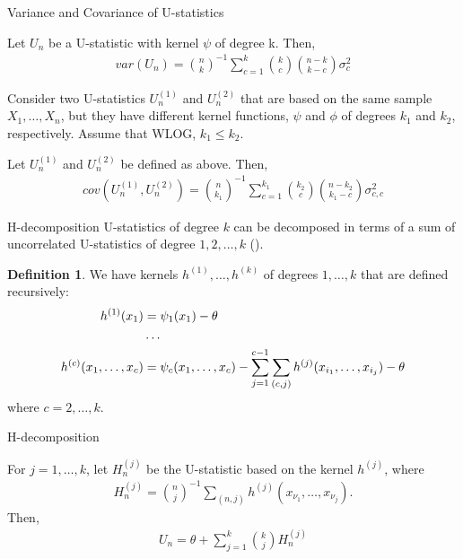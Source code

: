 \documentclass{beamer}
\theoremstyle{definition}
\newtheorem{Def}{Definition}
\numberwithin{Def}{section}
\begin{document}
\begin{frame}{Variance and Covariance of U-statistics}
\begin{theorem}\label{var_u_stat}
Let $U_n$ be a U-statistic with kernel $\psi$ of degree k. Then, 
\begin{align}
    var(U_n) = {n \choose k}^{-1}\sum_{c=1}^k{k \choose c}{n-k \choose k-c} \sigma_c^2
\end{align}
\end{theorem} 
\pause 
Consider two U-statistics $U_n^{(1)}$ and $U_n^{(2)}$ that are based on the same sample $X_1, \dotsc, X_n$, but they have different kernel functions, $\psi$ and $\phi$ of degrees $k_1$ and $k_2$, respectively. Assume that WLOG, $k_1 \leq k_2$. 
    \begin{theorem}
    Let $U_n^{(1)}$ and $U_n^{(2)}$ be defined as above. Then, 
    \begin{align}
        cov(U_n^{(1)}, U_n^{(2)}) = {n \choose k_1}^{-1}\sum_{c=1}^{k_1}{k_2 \choose c}{n-k_2 \choose k_1 - c}\sigma_{c,c}^2
        \end{align}
    \end{theorem}  

\end{frame}

\begin{frame}{H-decomposition}
U-statistics of degree $k$ can be decomposed in terms of a sum of uncorrelated U-statistics of degree $1, 2, \dotsc, k$  (\cite{hoeffding1961strong}). 

\begin{Def}
We have kernels $h^{(1)}, \dotsc, h^{(k)}$ of degrees $1, \dotsc, k$ that are defined recursively:
\begin{align}
    h^{(1)}(x_1) &= \psi_1(x_1) - \theta \notag \\
    &\dotsc \notag \\
    h^{(c)}(x_1, \dotsc, x_c) &= \psi_c(x_1, \dotsc, x_c) - \sum_{j=1}^{c-1}\sum_{(c,j)}h^{(j)}(x_{i_1}, \dotsc, x_{i_j}) - \theta \label{h_recursive}
\end{align}
where $c = 2, \dotsc, k$. 
\end{Def}
\end{frame}

\begin{frame}{H-decomposition}
 \begin{theorem}
For $j = 1, \dotsc, k$, let $H_n^{(j)}$ be the U-statistic based on the kernel $h^{(j)}$, where \begin{align}
H_n^{(j)} = {n \choose j}^{-1} \sum_{(n,j)}h^{(j)}(x_{\nu_1}, \dotsc, x_{\nu_j}). 
\end{align}
Then,
\begin{align}
    U_n  = \theta + \sum_{j=1}^k{k \choose j}H_n^{(j)}
\end{align}
\end{theorem}   
\end{frame}
\end{document}
